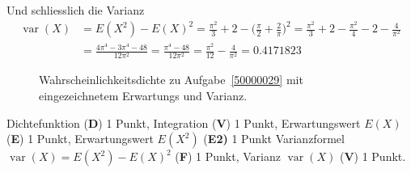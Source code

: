 \begin{loesung}
\begin{teilaufgaben}
Und schliesslich die Varianz
\begin{align*}
\operatorname{var}(X)
&=
E(X^2)-E(X)^2
=
\frac{\pi^2}3+2-\biggl(\frac{\pi}{2}+\frac{2}{\pi}\biggr)^2
=
\frac{\pi^2}3+2-\frac{\pi^2}{4}-2-\frac{4}{\pi^2}
\\
&=
\frac{4\pi^4-3\pi^4-48}{12\pi^2}
=
\frac{\pi^4-48}{12\pi^2}=\frac{\pi^2}{12}-\frac{4}{\pi^2}=0.4171823
\end{align*}
\end{teilaufgaben}
\begin{figure}
\centering
{}
\caption{Wahrscheinlichkeitsdichte zu Aufgabe~\ref{50000029} mit
eingezeichnetem Erwartungs und Varianz.
\label{50000029:phievar}}
\end{figure}
\end{loesung}


\begin{bewertung}
Dichtefunktion ({\bf D}) 1 Punkt,
Integration ({\bf V}) 1 Punkt,
Erwartungswert $E(X)$ ({\bf E}) 1 Punkt,
Erwartungswert $E(X^2)$ ({\bf E2)} 1 Punkt
Varianzformel $\operatorname{var}(X)=E(X^2)-E(X)^2$ ({\bf F}) 1 Punkt,
Varianz $\operatorname{var}(X)$ ({\bf V}) 1 Punkt.
\end{bewertung}




